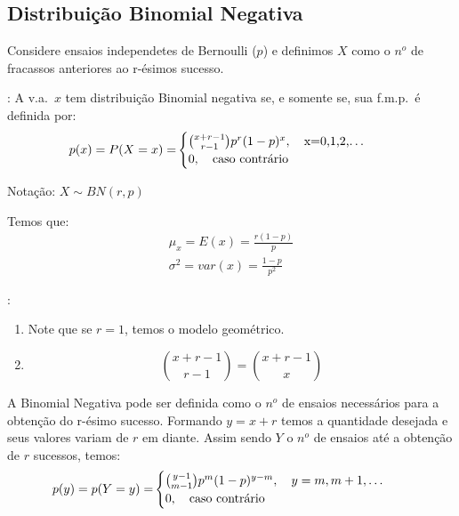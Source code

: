       \subsection{Distribuição Binomial Negativa}
      \begin{description}
        \item  Considere ensaios independetes de Bernoulli ($p$) e definimos $X$ como o $n^o$ 
      de fracassos anteriores ao r-ésimos sucesso.

    \item[Definição]: A v.a.\ $x$ tem distribuição Binomial negativa se, e somente se,
      sua f.m.p.\ é definida por:
      \begin{align}
        p(x)=P(X=x)=&
        \begin{cases}
          \binom{x+r-1}{r-1} p^r (1-p)^x, \text{\quad x=0,1,2,\dots} \\
          0, \text{\quad caso contrário}
        \end{cases}
      \end{align}
    \begin{center}Notação: $X \mathtt{\sim}BN(r,p)$\end{center}
      Temos que: 
      \begin{align}
        \mu_{x}=E(x)=\frac{r(1-p)}{p} \\
        \sigma^2 = var(x)=\frac{1-p}{p^2}
      \end{align}
    \item[Observações]: 
      \begin{enumerate}
        \item Note que se $r=1$, temos o modelo geométrico.
        \item $$\binom{x+r-1}{r-1} = \binom{x+r-1}{x}$$
      \end{enumerate}
    \item A Binomial Negativa pode ser definida como o $n^o$ de ensaios necessários para 
      a obtenção do r-ésimo sucesso. Formando $y=x+r$ temos a quantidade desejada e 
      seus valores variam de $r$ em diante. Assim sendo $Y$ o $n^o$ de ensaios até 
      a obtenção de $r$ sucessos, temos: 
      \begin{align}
        p(y)=p(Y=y)=&\begin{cases}
          \binom{y-1}{m-1}p^m(1-p)^{y-m}, \text{\quad }y=m,m+1,\dots \\
          0, \text{\quad caso contrário}
        \end{cases}
      \end{align}

\end{description}
